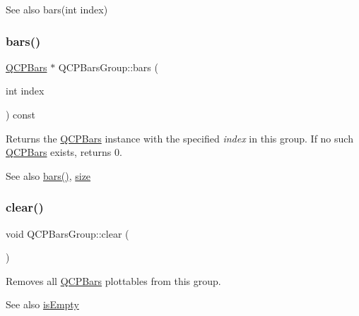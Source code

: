 \begin{DoxySeeAlso}{See also}
bars(int index) 
\end{DoxySeeAlso}
\mbox{\label{class_q_c_p_bars_group_a0754d659a020aa7fddfe81e657ce2d92}} 
\subsubsection{\texorpdfstring{bars()}{bars()}\hspace{0.1cm}{\footnotesize\ttfamily [2/2]}}
{\footnotesize\ttfamily \hyperlink{class_q_c_p_bars}{Q\+C\+P\+Bars} $\ast$ Q\+C\+P\+Bars\+Group\+::bars (\begin{DoxyParamCaption}\item[{int}]{index }\end{DoxyParamCaption}) const}

Returns the \hyperlink{class_q_c_p_bars}{Q\+C\+P\+Bars} instance with the specified {\itshape index} in this group. If no such \hyperlink{class_q_c_p_bars}{Q\+C\+P\+Bars} exists, returns 0.

\begin{DoxySeeAlso}{See also}
\hyperlink{class_q_c_p_bars_group_a6e4f4e86abbec6a9342f204ef82abef8}{bars()}, \hyperlink{class_q_c_p_bars_group_a3780ec77919cb00840207ec7a0f00dd5}{size} 
\end{DoxySeeAlso}
\mbox{\label{class_q_c_p_bars_group_a3ddf23928c6cd89530bd34ab7ba7b177}} 
\subsubsection{\texorpdfstring{clear()}{clear()}}
{\footnotesize\ttfamily void Q\+C\+P\+Bars\+Group\+::clear (\begin{DoxyParamCaption}{ }\end{DoxyParamCaption})}

Removes all \hyperlink{class_q_c_p_bars}{Q\+C\+P\+Bars} plottables from this group.

\begin{DoxySeeAlso}{See also}
\hyperlink{class_q_c_p_bars_group_aac959e79e852e8ef9aea6e0449ad000a}{is\+Empty} 
\end{DoxySeeAlso}
\mbox{\label{class_q_c_p_bars_group_a309a5f7233db189f3ea9c2d04ece6c13}} 
